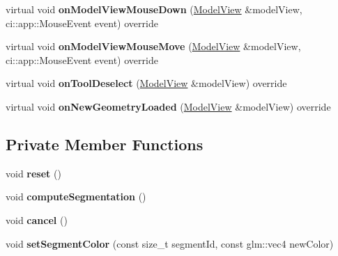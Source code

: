 \begin{DoxyCompactItemize}
\mbox{\label{classpepr3d_1_1_segmentation_a7c9ae1b970f2b19f7c8cc6d7009b106d}} 
virtual void {\bfseries on\+Model\+View\+Mouse\+Down} (\mbox{\hyperlink{classpepr3d_1_1_model_view}{Model\+View}} \&model\+View, ci\+::app\+::\+Mouse\+Event event) override
\item 
\mbox{\label{classpepr3d_1_1_segmentation_a42edd9ea2cb784c82804d3e84dcde864}} 
virtual void {\bfseries on\+Model\+View\+Mouse\+Move} (\mbox{\hyperlink{classpepr3d_1_1_model_view}{Model\+View}} \&model\+View, ci\+::app\+::\+Mouse\+Event event) override
\item 
\mbox{\label{classpepr3d_1_1_segmentation_abe22494520721c3d078daca8abbfd4ae}} 
virtual void {\bfseries on\+Tool\+Deselect} (\mbox{\hyperlink{classpepr3d_1_1_model_view}{Model\+View}} \&model\+View) override
\item 
\mbox{\label{classpepr3d_1_1_segmentation_ac8b133f64246862034299f64b38cd080}} 
virtual void {\bfseries on\+New\+Geometry\+Loaded} (\mbox{\hyperlink{classpepr3d_1_1_model_view}{Model\+View}} \&model\+View) override
\end{DoxyCompactItemize}
\subsection*{Private Member Functions}
\begin{DoxyCompactItemize}
\item 
\mbox{\label{classpepr3d_1_1_segmentation_a753243eb08623cc0e4e742b9b80d6fe1}} 
void {\bfseries reset} ()
\item 
\mbox{\label{classpepr3d_1_1_segmentation_ad2c81addb59679af3aad6753bfb3e187}} 
void {\bfseries compute\+Segmentation} ()
\item 
\mbox{\label{classpepr3d_1_1_segmentation_a2ee801c12891b63645c44460692351f4}} 
void {\bfseries cancel} ()
\item 
\mbox{\label{classpepr3d_1_1_segmentation_aeed45ad861dcf859e90b9b5d317655f1}} 
void {\bfseries set\+Segment\+Color} (const size\+\_\+t segment\+Id, const glm\+::vec4 new\+Color)
\end{DoxyCompactItemize}
